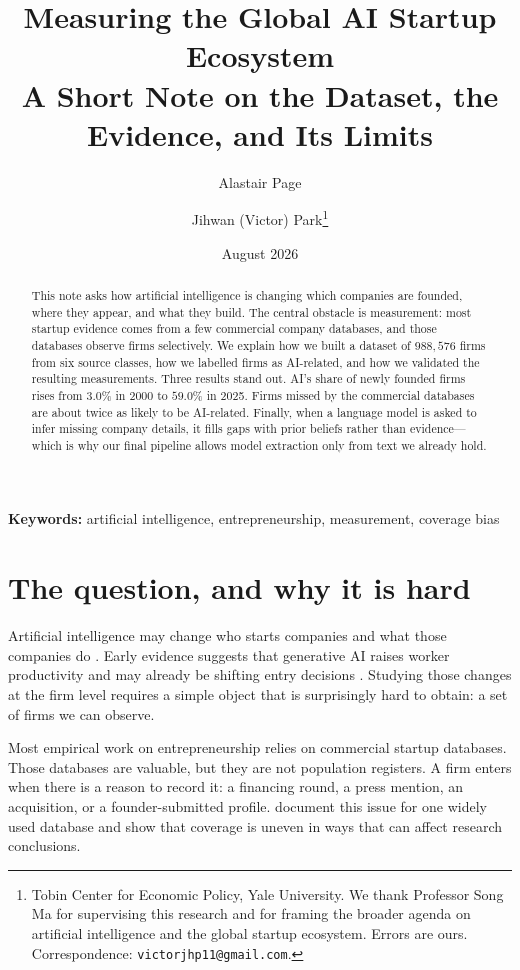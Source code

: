 \documentclass[11pt]{article}
\title{\textbf{Measuring the Global AI Startup Ecosystem}\\[0.35em]
\large A Short Note on the Dataset, the Evidence, and Its Limits}
\author{Alastair Page \and Jihwan (Victor) Park\thanks{%
Tobin Center for Economic Policy, Yale University. We thank Professor Song Ma
for supervising this research and for framing the broader agenda on artificial
intelligence and the global startup ecosystem. Errors are ours.
Correspondence: \texttt{victorjhp11@gmail.com}.}}
\date{August 2026}
\begin{document}
\maketitle

\begin{abstract}
\noindent
This note asks how artificial intelligence is changing which companies are
founded, where they appear, and what they build. The central obstacle is
measurement: most startup evidence comes from a few commercial company
databases, and those databases observe firms selectively. We explain how we
built a dataset of $988{,}576$ firms from six source classes, how we labelled
firms as AI-related, and how we validated the resulting measurements. Three
results stand out. AI's share of newly founded firms rises from $3.0\%$ in 2000
to $59.0\%$ in 2025. Firms missed by the commercial databases are about twice
as likely to be AI-related. Finally, when a language model is asked to infer
missing company details, it fills gaps with prior beliefs rather than
evidence---which is why our final pipeline allows model extraction only from
text we already hold.
\end{abstract}

\medskip
\noindent\textbf{Keywords:} artificial intelligence, entrepreneurship,
measurement, coverage bias

\section{The question, and why it is hard}

Artificial intelligence may change who starts companies and what those
companies do \citep{fossen2024ai}. Early evidence suggests that generative AI
raises worker productivity \citep{brynjolfsson2023genai} and may already be
shifting entry decisions \citep{bena2025prompted}. Studying those changes at
the firm level requires a simple object that is surprisingly hard to obtain: a
set of firms we can observe.

Most empirical work on entrepreneurship relies on commercial startup databases.
Those databases are valuable, but they are not population registers. A firm
enters when there is a reason to record it: a financing round, a press mention,
an acquisition, or a founder-submitted profile. \citet{dalle2017crunchbase}
document this issue for one widely used database and show that coverage is
uneven in ways that can affect research conclusions.
\end{document}
